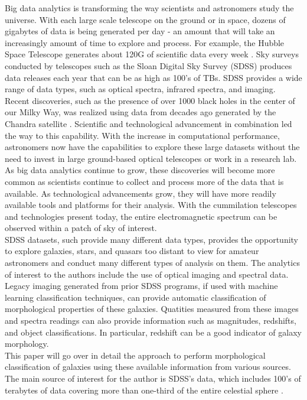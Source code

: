\documentclass[11pt,sigconf]{acmart}
\begin{document}
Big data analytics is transforming the way scientists and astronomers study the universe. 
With each large scale telescope on the ground or in space, dozens of gigabytes of data 
is being generated per day - an amount that will take an increasingly amount of time
to explore and process. For example, the Hubble Space Telescope generates about 120G of 
scientific data every week \cite{tillman}. Sky surveys conducted by telescopes such as
the Sloan Digital Sky Survey (SDSS) produces data releases each year that can be as high as
100's of TBs. SDSS provides a wide range of data types, such as optical spectra,
infrared spectra, and imaging. 
\\
Recent discoveries, such as the presence of over 1000 black holes 
in the center of our Milky Way, was realized using data from decades ago generated by
the Chandra satellite \cite{sagittarius}. Scientific and technological advancement in 
combination led the 
way to this capability. With the increase in computational performance, astronomers 
now have the capabilities to explore these large datasets without the need to invest 
in large ground-based optical telescopes or work in a research lab. 
As big data analytics continue to grow, these discoveries will become more common as 
scientists continue to collect and process more of the data that is available. As technological
advancements grow, they will have more readily available tools and platforms for their 
analysis. With the cummilation telescopes and technologies present today, the entire 
electromagnetic spectrum can be observed within a patch of sky of interest. 
\\
SDSS datasets, such provide many different data types, provides the opportunity to
explore galaxies, stars, and quasars too distant to view for amateur astronomers and 
conduct many different types of analysis on them. The analytics of interest to the
authors include the use of optical imaging and spectral data. Legacy imaging generated 
from prior SDSS programs, if used with machine learning classification techniques, 
can provide automatic classification of morphological properties of these galaxies. 
Quatities measured from these images and spectra readings can also provide information
such as magnitudes, redshifts, and object classifications. In particular, redshift can
be a good indicator of galaxy morphology. 
\\
This paper will go over in detail the approach to perform morphological classification of 
galaxies using these available information from various sources. The main source of interest
for the author is SDSS's data, which includes 100's of terabytes of data covering more
than one-third of the entire celestial sphere \cite{abdurro}.
\end{document}
